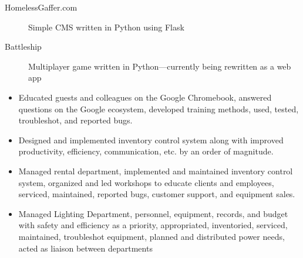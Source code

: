 \documentclass[letterpaper]{article}        %
\begin{document}

  \begin{description}
    \item[HomelessGaffer.com] Simple CMS written in Python using Flask
    \item[Battleship] Multiplayer game written in Python---currently being rewritten as a web app
    
  \end{description}


  
    \begin{itemize}
    \item Educated guests and colleagues on the Google Chromebook, answered questions on the Google ecosystem, developed training methods, used, tested, troubleshot, and reported bugs.
    \end{itemize}
  
    \begin{itemize}
    \item Designed and implemented inventory control system along with improved productivity, efficiency, communication, etc. by an order of magnitude.
    \end{itemize}
  
    \begin{itemize}
    \item Managed rental department, implemented and maintained inventory control system, organized and led workshops to educate clients and employees, serviced, maintained, reported bugs, customer support, and equipment sales.
    \end{itemize}
  
    \begin{itemize}
    \item Managed Lighting Department, personnel, equipment, records, and budget with safety and efficiency as a priority, appropriated, inventoried, serviced, maintained, troubleshot equipment, planned and distributed power needs, acted as liaison between departments
    \end{itemize}

\end{document}
